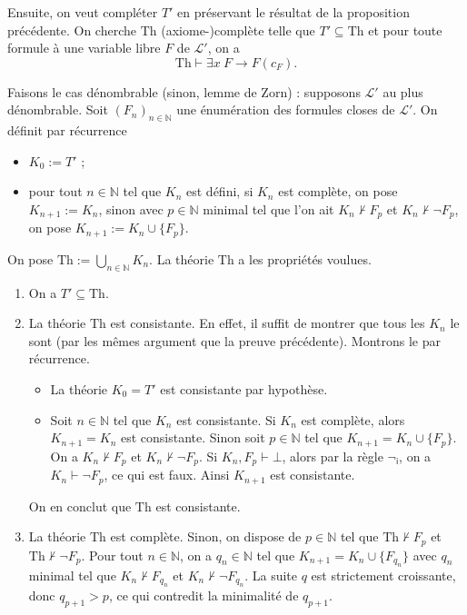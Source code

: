 \documentclass[./main]{subfiles}
\begin{document}
  Ensuite, on veut compléter $T'$ en préservant le résultat de la proposition précédente.
  On cherche $\mathrm{Th}$ (axiome-)complète telle que $T' \subseteq \mathrm{Th}$ et pour toute formule à une variable libre $F$ de $\mathcal{L}'$, on a \[
  \mathrm{Th} \vdash \exists x \: F \to F(c_F)
  .\]

  Faisons le cas dénombrable (sinon, lemme de Zorn) : supposons $\mathcal{L}'$ au plus dénombrable.
  Soit $(F_n)_{n \in \mathds{N}}$ une énumération des formules closes de $\mathcal{L}'$.
  On définit par récurrence
  \begin{itemize}
    \item $K_0 := T'$ ;
    \item pour tout $n \in \mathds{N}$ tel que $K_n$ est défini, si $K_n$ est complète, on pose $K_{n+1} := K_n$, sinon avec $p \in \mathds{N}$ minimal tel que l'on ait $K_n \nvdash F_p$ et $K_n \nvdash \lnot F_p$, on pose $K_{n+1} := K_n \cup \{F_p\}$.
  \end{itemize}

  \begin{lem}
    On pose $\mathrm{Th} := \bigcup_{n \in \mathds{N}} K_n$.
    La théorie $\mathrm{Th}$ a les propriétés voulues.
  \end{lem}

  \begin{prv}
    \begin{enumerate}
      \item On a $T' \subseteq \mathrm{Th}$.
      \item La théorie $\mathrm{Th}$ est consistante.
        En effet, il suffit de montrer que tous les $K_n$ le sont (par les mêmes argument que la preuve précédente).
        Montrons le par récurrence.
        \begin{itemize}
          \item La théorie $K_0 = T'$ est consistante par hypothèse.
          \item Soit $n \in \mathds{N}$ tel que $K_n$ est consistante.
            Si $K_n$ est complète, alors $K_{n+1} = K_n$ est consistante.
            Sinon soit $p \in \mathds{N}$ tel que $K_{n+1} = K_n \cup \{F_p\}$. On a $K_n \nvdash F_p$ et $K_n \nvdash \lnot F_p$. Si $K_n, F_p \vdash \bot$, 
            alors par la règle $\lnot_\mathsf{i}$, on a $K_n \vdash \lnot F_p$, ce qui est faux.
            Ainsi $K_{n+1}$ est consistante.
        \end{itemize}
        On en conclut que $\mathrm{Th}$ est consistante.
      \item La théorie $\mathrm{Th}$ est complète.
        Sinon, on dispose de $p \in \mathds{N}$ tel que $\mathrm{Th} \nvdash F_p$ et $\mathrm{Th} \nvdash \lnot F_p$.
        Pour tout $n \in \mathds{N}$, on a $q_n \in \mathds{N}$ tel que $K_{n+1} = K_n \cup \{F_{q_n}\}$ avec $q_n$ minimal tel que $K_n \nvdash F_{q_n}$ et $K_n \nvdash \lnot F_{q_n}$.
        La suite $q$ est strictement croissante, donc $q_{p+1} > p$, ce qui contredit la minimalité de $q_{p+1}$.
    \end{enumerate}
  \end{prv}
\end{document}
